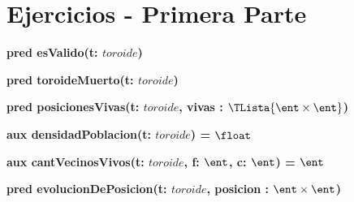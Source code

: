 \documentclass[spanish, a4paper]{article}
\newcommand{\tupla}[2]{#1 \times #2}
\begin{document}
\newcommand{\toroide}{\textit{toroide}}
\newcommand{\bin}{\ensuremath{\ent \times \ent}}

\fecha{\today}


\maketitle



\section{Ejercicios - Primera Parte}




\begin{ejercicio}[:]
\textbf{pred esValido(t: $\toroide$)}


\end{ejercicio}

\begin{ejercicio}[:]
\textbf{pred toroideMuerto(t: $\toroide$)}

\end{ejercicio}


\begin{ejercicio}[:]
\textbf{pred posicionesVivas(t: $\toroide$, vivas : $\TLista{\tupla{\ent}{\ent}}$)}

\end{ejercicio}

\begin{ejercicio}[:]
\textbf{aux densidadPoblacion(t: $\toroide$) = $\float$}

\end{ejercicio}

\begin{ejercicio}[:]
\textbf{aux cantVecinosVivos(t: $\toroide$, f: $\ent$, c: $\ent$) = $\ent$}

\end{ejercicio}


\begin{ejercicio}[:]
\textbf{pred evolucionDePosicion(t: $\toroide$, posicion : $\tupla{\ent}{\ent}$)}

\end{ejercicio}
\end{document}
